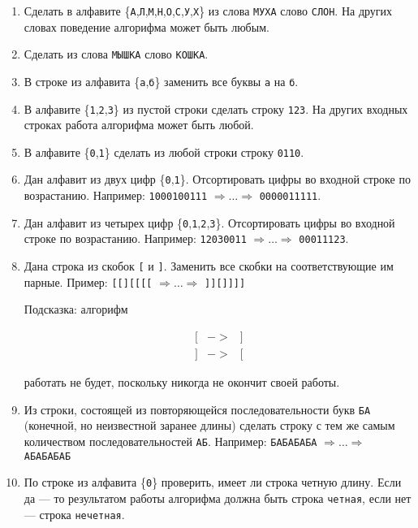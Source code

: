 \documentclass[12pt,a4paper,oneside]{article}
\newcommand{\s}[1]{\texttt{#1}}
\begin{document}
\begin{enumerate}
\item Сделать в алфавите 
\{\s{А},\s{Л},\s{М},\s{Н},\s
{О},\s{С},\s{У},\s{Х}\} из слова \s{МУХА} слово \s{СЛОН}.
На других словах поведение алгорифма может быть любым.

\item Сделать из слова \s{МЫШКА} слово \s{КОШКА}.

\item В строке из алфавита \{\s{а},\s{б}\} заменить все буквы \s{а} на \s{б}.

\item В алфавите \{\s{1},\s{2},\s{3}\} из пустой строки сделать 
строку \s{123}. На других
входных строках работа алгорифма может быть любой.

\item В алфавите \{\s{0},\s{1}\} сделать из любой строки строку 
\s{0110}.

\item Дан алфавит из двух цифр \{\s{0},\s{1}\}. Отсортировать 
цифры во входной строке по возрастанию. Например: \s{1000100111} 
$\Rightarrow\dots\Rightarrow$ \s{0000011111}.

\item Дан алфавит из четырех цифр \{\s{0},\s{1},\s{2},\s{3}\}. 
Отсортировать цифры во входной строке по возрастанию. Например: 
\s{12030011} $\Rightarrow\dots\Rightarrow$ \s{00011123}.

\item Дана строка из скобок \s{[} и \s{]}. Заменить все скобки на соответствующие
им парные. Пример: \s{[[][[[[} $\Rightarrow\dots\Rightarrow$ \s{]][]]]]}

Подсказка: алгорифм
\begin{bnf}\begin{eqnarray*}
\s{[}&->&\s{]}\\
\s{]}&->&\s{[}
\end{eqnarray*}\end{bnf}работать не будет, 
поскольку никогда не окончит своей работы.

\item Из строки, состоящей из повторяющейся последовательности букв \s{БА}
(конечной, но неизвестной заранее длины) сделать строку с тем же самым
количеством последовательностей \s{АБ}.
Например: \s{БАБАБАБА} $\Rightarrow\dots\Rightarrow$ \s{АБАБАБАБ}

\item По строке из алфавита \{\s{0}\} проверить, имеет ли строка четную длину.
Если да --- то результатом работы алгорифма должна быть строка \s{четная}, если
нет --- строка \s{нечетная}.


\end{enumerate}
\end{document}

